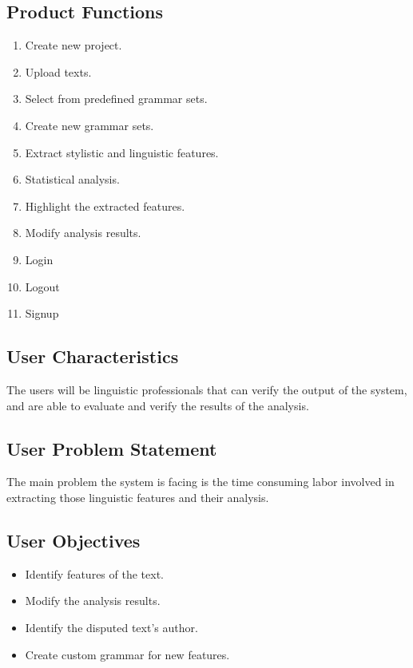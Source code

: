 \subsection{Product Functions}
\begin{enumerate}
    \item Create new project.
    \item Upload texts.
    \item Select from predefined grammar sets.
    \item Create new grammar sets.
    \item Extract stylistic and linguistic features.
    \item Statistical analysis.
    \item Highlight the extracted features.
    \item Modify analysis results.
    \item Login
    \item Logout
    \item Signup
\end{enumerate}
\subsection{User Characteristics}
The users will be linguistic professionals that can verify the output of the system, and are able to evaluate and verify the results of the analysis.
\subsection{User Problem Statement}
The main problem the system is facing is the time consuming labor involved in extracting those linguistic features and their analysis.
\subsection{User Objectives}
\begin{itemize}
    \item Identify features of the text.
    \item Modify the analysis results.
    \item Identify the disputed text's author.
    \item Create custom grammar for new features.
\end{itemize}

